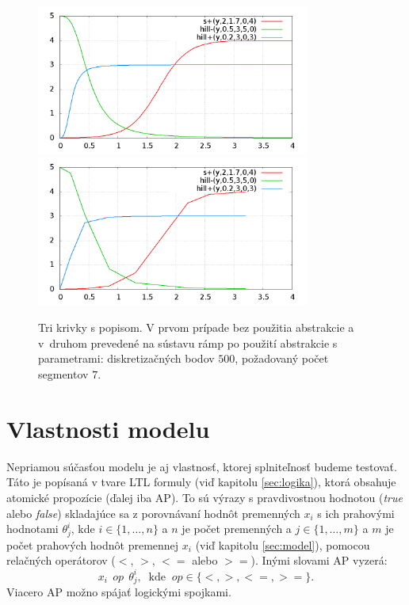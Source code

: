 \documentclass[11pt,final,oneside]{fithesis}
\begin{document}
\begin{figure}[h]
    \centering
    \includegraphics[width=0.80\textwidth]{abstractNO}
    \includegraphics[width=0.80\textwidth]{abstractYES}
    \caption{Tri krivky s popisom. V prvom pr\'ipade bez pou\v zitia abstrakcie a v~druhom preveden\'e na s\'ustavu r\'amp po pou\v zit\'i abstrakcie 
    s parametrami: diskretiza\v cn\'ych bodov $500$, po\v zadovan\'y po\v cet segmentov $7$.}
	\label{fig:noabstract}
\end{figure}

\section{Vlastnosti modelu}
Nepriamou s\'u\v cas\v tou modelu je aj vlastnos\v t, ktorej splnite\v lnos\v t budeme testova\v t. T\'ato je pop\'isan\'a v tvare LTL formuly (vi\v d
kapitolu \ref{sec:logika}), ktor\'a obsahuje atomick\'e propoz\'icie (\v dalej iba AP). To s\'u v\'yrazy s pravdivostnou hodnotou ({\it true} alebo 
{\it false}) skladaj\'uce sa z porovn\'avan\'i hodn\^ ot premenn\'ych $x_i$ s ich prahov\'ymi hodnotami $\theta^i_j$, kde $i \in \{1,\dots{},n\}$ a $n$ je 
po\v cet premenn\'ych a $j \in \{1,\dots{},m\}$ a $m$ je po\v cet prahov\'ych hodn\^ ot premennej $x_i$ (vi\v d kapitolu \ref{sec:model}), 
pomocou rela\v cn\'ych oper\'atorov ($<$, $>$, $<=$ alebo $>=$). In\'ymi slovami AP vyzer\'a: 
\begin{equation*}
x_i\ \ op \ \ \theta^i_j, \ \textrm{ kde } \ op \in \{<,>,<=,>=\}.
\end{equation*}
Viacero AP mo\v zno sp\'aja\v t logick\'ymi spojkami.
\end{document}
